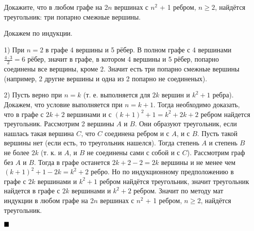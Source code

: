 \documentclass[a4paper, 16pt]{article}
\newenvironment{proof}[1][Доказательство]{%
	\begin{trivlist}
		\item[\hskip \labelsep {\bfseries #1:}]
		\item \hspace{15pt}
	}{
		$ \hfill\blacksquare $
	\end{trivlist}
	\hfill\break
}
\begin{document}
		Докажите, что в любом графе на 2$n$ вершинах с $n^2$ + 1 ребром, $n \geq 2$, найдётся треугольник: три попарно смежные вершины.
	
		\begin{proof}
			Докажем по индукции.
			
			1) При $n=2$ в графе 4 вершины и 5 рёбер. В полном графе с 4 вершинами $\frac{4 \cdot 3}{2} = 6$ рёбер, значит в графе, в котором 4 вершины и 5 рёбер, попарно соединены все верщины, кроме 2. Значит есть три попарно смежные вершины (например, 2 другие вершины и одна из 2 попарно не соединеных). 
			
			2) Пусть верно при $n=k$ (т. е. выполняется для $2k$ вершин и $k^2+1$ ребра). Докажем, что условие выполняется при $n = k + 1$.
			Тогда необходимо доказать, что в графе с $2k+2$ вершинами и с $(k+1)^2+1=k^2+2k+2$ ребром найдется треугольник. Рассмотрим 2 вершины $A$ и $B$. Они образуют треугольник, если нашлась такая вершина $C$, что $C$ соединена ребром и с $A$, и с $B$. Пусть такой вершины нет (если есть, то треугольник нашелся). Тогда степень $A$ и степень $B$ не более $2k$ (т. к. и $A$, и $B$ не соединены сами с собой и с $C$). Рассмотрим граф без $A$ и $B$. Тогда в графе останется $2k+2-2=2k$ вершины и не менее чем $(k+1)^2 + 1 - 2k = k^2+2$ ребро. Но по индукционному предположению в графе с $2k$ вершинами и $k^2+1$ ребром найдётся треугольник, значит треугольник найдется в графе с $2k$ вершинами и $k^2+2$ ребром.  Значит по методу мат индукции в любом графе на 2$n$ вершинах с $n^2$ + 1 ребром, $n \geq 2$, найдётся треугольник.
		\end{proof}
	
\end{document}
